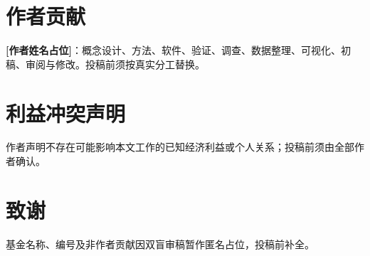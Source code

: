 \documentclass[preprint,12pt]{elsarticle}
\begin{document}
\section*{作者贡献}
\textbf{[作者姓名占位]}：概念设计、方法、软件、验证、调查、数据整理、可视化、初稿、审阅与修改。投稿前须按真实分工替换。

\section*{利益冲突声明}
作者声明不存在可能影响本文工作的已知经济利益或个人关系；投稿前须由全部作者确认。

\section*{致谢}
基金名称、编号及非作者贡献因双盲审稿暂作匿名占位，投稿前补全。



\end{document}
